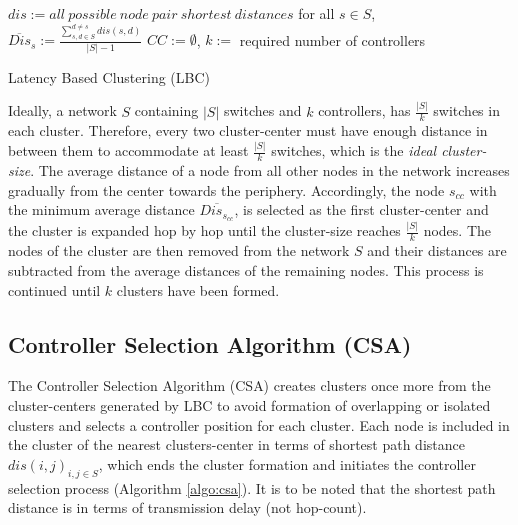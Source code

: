 \documentclass[preprint,12pt]{elsarticle}
\begin{document}
	\begin{algorithm}
		\SetAlgoLined
		$dis := all~possible~node~pair~shortest~distances$\;
		for all $s\in S$, $\overline{Dis}_s := \frac{\sum_{s,d \in S}^{d \ne s}dis(s,d)}{|S|-1}$\;
		$CC := \emptyset$, $k :=$ required number of controllers\;
		\caption{Latency Based Clustering (LBC)} \label{algo:lbc}
	\end{algorithm}

	Ideally, a network $S$ containing $|S|$ switches and $k$ controllers, has $\frac{|S|}{k}$ switches in each cluster. Therefore, every two cluster-center must have enough distance in between them to accommodate at least $\frac{|S|}{k}$ switches, which is the \textit{ideal cluster-size}. The average distance of a node from all other nodes in the network increases gradually from the center towards the periphery. Accordingly, the node $s_{cc}$ with the minimum average distance $\overline{Dis_{s_{cc}}}$, is selected as the first cluster-center and the cluster is expanded hop by hop until the cluster-size reaches $\frac{|S|}{k}$ nodes. The nodes of the cluster are then removed from the network $S$ and their distances are subtracted from the average distances of the remaining nodes. This process is continued until $k$ clusters have been formed.
	
	\subsection{Controller Selection Algorithm (CSA)} \label{csa}
	
	The Controller Selection Algorithm (CSA) creates clusters once more from the cluster-centers generated by LBC to avoid formation of overlapping or isolated clusters and selects a controller position for each cluster. Each node is included in the cluster of the nearest clusters-center in terms of shortest path distance $dis(i,j)_{i,j \in S}$, which ends the cluster formation and initiates the controller selection process (Algorithm \ref{algo:csa}). It is to be noted that the shortest path distance is in terms of transmission delay (not hop-count).
	
\end{document}
